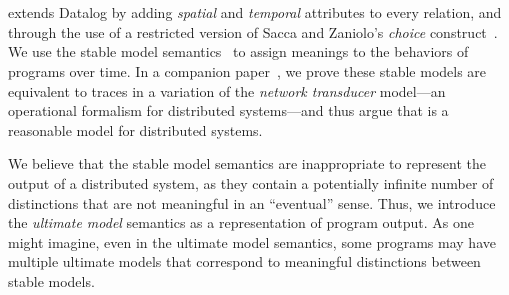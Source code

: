 \section{\large \bf \lang}
\label{sec:foundation}

\lang extends Datalog by adding {\em spatial} and {\em temporal} attributes to every relation, and through the use of a restricted version of Sacca and Zaniolo's {\em choice} construct~\cite{sacca-zaniolo}.  We use the stable model semantics~\cite{stable-model} to assign meanings to the behaviors of \lang programs over time.  
In a companion paper~\cite{ameloot-operational}, we prove these stable models are equivalent to traces in a variation of the {\em network transducer} model---an operational formalism for distributed systems---and thus argue that \lang is a reasonable model for distributed systems.

We believe that the stable model semantics are inappropriate to represent the output of a distributed system, as they contain a potentially infinite number of distinctions that are not meaningful in an ``eventual'' sense.  Thus, we introduce the {\em ultimate model} semantics as a representation of program output.  As one might imagine, even in the ultimate model semantics, some programs may have multiple ultimate models that correspond to meaningful distinctions between stable models.


